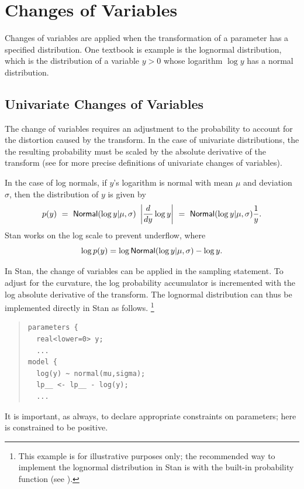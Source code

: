 \section{Changes of Variables}

Changes of variables are applied when the transformation of a
parameter has a specified distribution.  One textbook is example is
the lognormal distribution, which is the distribution of a variable
$y > 0$ whose logarithm $\log y$ has a normal distribution.  

\subsection{Univariate Changes of Variables}

The change of variables requires an adjustment to the probability to
account for the distortion caused by the transform.  In the case of
univariate distributions, the the resulting probability must be scaled
by the absolute derivative of the transform (see
 for more precise definitions of
univariate changes of variables).

In the case of log normals, if $y$'s logarithm is normal with mean
$\mu$ and deviation $\sigma$, then the distribution of $y$ is given by
\[
p(y) 
\ = \
\mbox{\sf Normal}(\log y| \mu, \sigma) \  \left| \frac{d}{dy} \log y \right|
\ = \
\mbox{\sf Normal}(\log y| \mu, \sigma) \frac{1}{y}.
\]
Stan works on the log scale to prevent underflow, where
\[
\log p(y) 
=
\log \mbox{\sf Normal}(\log y| \mu, \sigma)
- \log y.
\]

In Stan, the change of variables can be applied in the sampling
statement.  To adjust for the curvature, the log probability
accumulator is incremented with the log absolute derivative of the
transform.  The lognormal distribution can thus be implemented
directly in Stan as follows.%
%
\footnote{This example is for illustrative purposes only; the
  recommended way to implement the lognormal distribution in Stan is
  with the built-in \code{lognormal} probability function (see ).}
%
\begin{quote}
\begin{Verbatim}
parameters {
  real<lower=0> y;
  ...
model {
  log(y) ~ normal(mu,sigma);
  lp__ <- lp__ - log(y);
  ...
\end{Verbatim}
\end{quote}
%
It is important, as always, to declare appropriate constraints on
parameters;  here  is constrained to be positive. 

